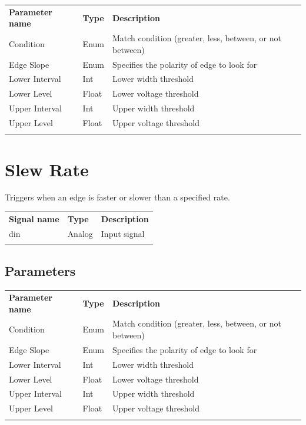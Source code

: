 \begin{tabularx}{16cm}{llX}
\thickhline
\textbf{Parameter name} & \textbf{Type} & \textbf{Description} \\
\thickhline
Condition & Enum & Match condition (greater, less, between, or not between) \\
\thinhline
Edge Slope & Enum & Specifies the polarity of edge to look for\\
\thinhline
Lower Interval & Int & Lower width threshold\\
\thinhline
Lower Level & Float & Lower voltage threshold\\
\thinhline
Upper Interval & Int & Upper width threshold\\
\thinhline
Upper Level & Float & Upper voltage threshold\\
\thickhline
\end{tabularx}

\section{Slew Rate}

Triggers when an edge is faster or slower than a specified rate.

\begin{tabularx}{16cm}{llX}
\thickhline
\textbf{Signal name} & \textbf{Type} & \textbf{Description} \\
\thickhline
din & Analog & Input signal \\
\thickhline
\end{tabularx}

\subsection{Parameters}

\begin{tabularx}{16cm}{llX}
\thickhline
\textbf{Parameter name} & \textbf{Type} & \textbf{Description} \\
\thickhline
Condition & Enum & Match condition (greater, less, between, or not between) \\
\thinhline
Edge Slope & Enum & Specifies the polarity of edge to look for\\
\thinhline
Lower Interval & Int & Lower width threshold\\
\thinhline
Lower Level & Float & Lower voltage threshold\\
\thinhline
Upper Interval & Int & Upper width threshold\\
\thinhline
Upper Level & Float & Upper voltage threshold\\
\thickhline
\end{tabularx}

